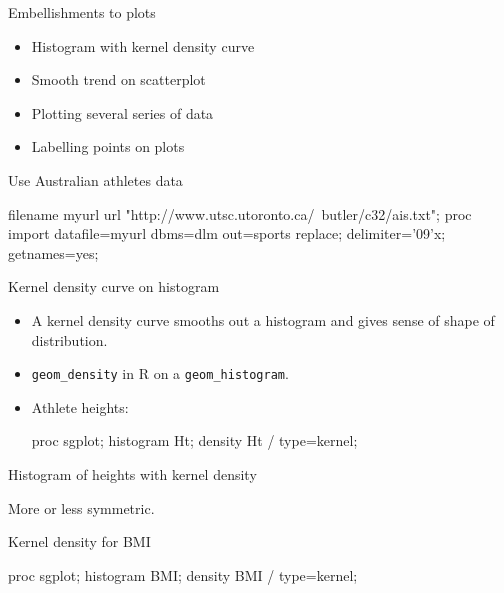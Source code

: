 \documentclass[unknownkeysallowed]{beamer}\usepackage[]{graphicx}\usepackage[]{color}
\begin{document}
\begin{frame}[fragile]{Embellishments to plots}
  
  \begin{itemize}
  \item Histogram with kernel density curve
  \item Smooth trend on scatterplot
  \item Plotting several series of data
  \item Labelling points on plots
  \end{itemize}
  
\end{frame}

\begin{frame}[fragile]{Use Australian athletes data}
  
    \begin{Datastep}
filename myurl url 
  "http://www.utsc.utoronto.ca/~butler/c32/ais.txt";      
proc import 
  datafile=myurl
  dbms=dlm
  out=sports
  replace;
  delimiter='09'x;
  getnames=yes;
    \end{Datastep}
  
  
\end{frame}


\begin{frame}[fragile]{Kernel density curve on histogram}

  \begin{itemize}
  \item A kernel density curve smooths out a histogram and gives sense
    of shape of distribution.
  \item \texttt{geom\_density} in R on a \texttt{geom\_histogram}.
  \item Athlete heights:
\begin{Sascode}[store=mix]
proc sgplot;
  histogram Ht;
  density Ht / type=kernel;
\end{Sascode}

  \end{itemize}
  
\end{frame}

\begin{frame}[fragile]{Histogram of heights with kernel density}


More or less symmetric.
  
\end{frame}

\begin{frame}[fragile]{Kernel density for BMI}
  
\begin{Sascode}[store=miy]
proc sgplot;
  histogram BMI;
  density BMI / type=kernel;
\end{Sascode}
  
  
\end{frame}
\end{document}
